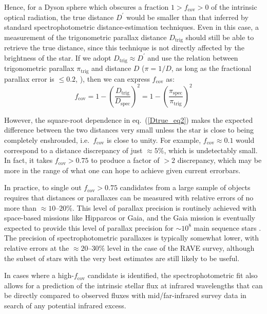 \documentclass[twocolumn]{aastex6}
\begin{document}
Hence, for a Dyson sphere which obscures a fraction $1>f_\mathrm{cov}>0$ of the intrinsic optical radiation, the true distance $D^\prime$ would be smaller than that inferred by standard spectrophotometric distance-estimation techniques. Even in this case, a measurement of the trigonometric parallax distance $D_\mathrm{trig}$ should still be able to retrieve the true distance, since this technique is not directly affected by the brightness of the star. If we adopt $D_\mathrm{trig}\approx D^\prime$ and use the relation between trigonometric parallax $\pi_\mathrm{trig}$ and distance $D$ ($\pi=1/D$, as long as the fractional parallax error is $\leq 0.2$, \citealt{Bailer-Jones2015}), then we can express $f_\mathrm{cov}$ as:
\begin{equation}
f_\mathrm{cov}  =  1-\left( \frac{D_\mathrm{trig}}{D_\mathrm{spec}} \right)^2 = 1-\left( \frac{\pi_\mathrm{spec}}{\pi_\mathrm{trig}} \right)^2
\label{fcov_eq}
\end{equation}

However, the square-root dependence in eq.~(\ref{Dtrue_eq2}) makes the expected difference between the two distances very small unless the star is close to being completely enshrouded, i.e.\ $f_\mathrm{cov}$ is close to unity. For example, $f_\mathrm{cov}\approx 0.1$ would correspond to a distance discrepancy of just $\approx 5\%$, which is undetectably small. In fact, it takes $f_\mathrm{cov}>0.75$ to produce a factor of $>2$ discrepancy, which may be more in the range of what one can hope to achieve given current errorbars.

In practice, to single out $f_\mathrm{cov}>0.75$ candidates from a large sample of objects requires that distances or parallaxes can be measured with relative errors of no more than $\approx 10$--$20\%$. This level of parallax precision is routinely achieved with space-based missions like Hipparcos or Gaia, and the Gaia mission is eventually expected to provide this level of parallax precision for $\sim 10^8$ main sequence stars \citep{Luri14}. The precision of spectrophotometric parallaxes is typically somewhat lower, with relative errors at the $\approx 20$--$30\%$ level \citep{Binney14} in the case of the RAVE survey, although the subset of stars with the very best estimates are still likely to be useful. 

In cases where a high-$f_\mathrm{cov}$ candidate is identified, the spectrophotometric fit also allows for a prediction of the intrinsic stellar flux at infrared wavelengths that can be directly compared to observed fluxes with mid/far-infrared survey data in search of any potential infrared excess. 
\end{document}
